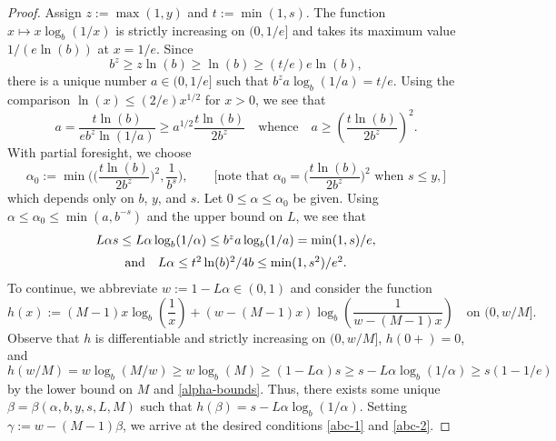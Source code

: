 \documentclass[12pt]{amsart}
\theoremstyle{definition}
\theoremstyle{remark}
\numberwithin{figure}{section}
\numberwithin{equation}{section}
\begin{document}
\begin{proof} Assign $z:=\max(1,y)$ and $t:=\min(1,s)$. The function $x\mapsto x\log_b(1/x)$ is strictly increasing on $(0,1/e]$ and takes its maximum value $1/(e\ln(b))$ at $x=1/e$. Since $$b^{z}\geq z\ln(b)\geq \ln(b)\geq (t/e)e\ln(b),$$ there is a unique number $a\in(0,1/e]$ such that $b^za\log_b(1/a)=t/e$. Using the comparison $\ln(x)\leq (2/e)x^{1/2}$ for $x>0$, we see that $$a = \frac{t\ln(b)}{eb^z\ln(1/a)} \geq a^{1/2}\frac{ t\ln(b)}{2b^z}\quad\text{whence}\quad a \geq \left(\frac{t\ln(b)}{2b^z}\right)^{2}.$$ With partial foresight, we choose  \begin{equation}\label{alpha-def} \alpha_0:=\min\bigg(\Big(\frac{t\ln(b)}{2b^z}\Big)^{2}, \frac{1}{b^s}\bigg),\qquad\bigg[\text{note that } \alpha_0=\Big(\frac{t\ln(b)}{2b^z}\Big)^{2}\text{ when }s\leq y,\bigg] \end{equation}  which depends only on $b$, $y$, and $s$. Let $0\leq \alpha\leq \alpha_0$ be given. Using $\alpha\leq \alpha_0\leq \min(a,b^{-s})$ and the upper bound on $L$, we see that\begin{equation}\label{alpha-bounds} \begin{array}{c} L\alpha s\leq L\alpha\log_b(1/\alpha) \leq b^z a\log_b(1/a) = \min(1,s)/e, \vspace{.2cm}\\
\text{and}\quad L\alpha \leq t^2\ln(b)^2/4b\leq \min(1,s^2)/e^2.\end{array}\end{equation} To continue, we abbreviate $w:=1-L\alpha\in(0,1)$ and consider the function $$h(x):=(M-1)x\log_b\left(\frac{1}{x}\right)+(w-(M-1)x)\log_b\left(\frac{1}{w-(M-1)x}\right)\quad\text{on }(0,w/M].$$ Observe that $h$ is differentiable and strictly increasing on $(0,w/M]$, $h(0+)=0$, and $$h(w/M)=w \log_b(M/w)\geq w\log_b(M)\geq (1-L\alpha)s\geq s-L\alpha\log_b(1/\alpha)\geq s(1-1/e)$$ by the lower bound on $M$ and \eqref{alpha-bounds}. Thus, there exists some unique $\beta=\beta(\alpha,b,y,s,L,M)$ such that $h(\beta)=s-L\alpha\log_b(1/\alpha)$. Setting $\gamma:=w-(M-1)\beta$, we arrive at the desired conditions \eqref{abc-1} and \eqref{abc-2}.


\end{proof}
\end{document}
